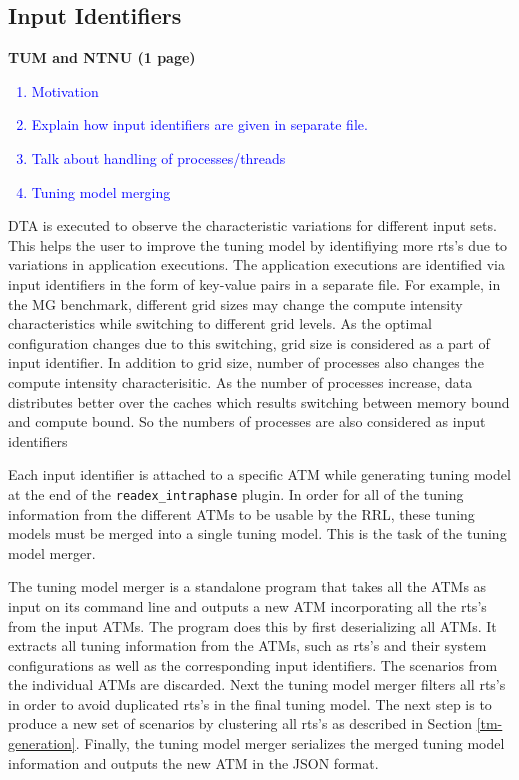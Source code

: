 \subsection{Input Identifiers} \label{sec:input}
\textbf{TUM and NTNU (1 page)}
\textcolor{blue}{
\begin{enumerate}
	\item Motivation
	\item Explain how input identifiers are given in separate file.
	\item Talk about handling of processes/threads
	\item Tuning model merging
\end{enumerate}}
DTA is executed to observe the characteristic variations for different input sets. This helps the user to improve the tuning model by identifiying more rts's due to variations in application executions. The application executions are identified via input identifiers in the form of key-value pairs in a separate file. For example, in the MG benchmark, different grid sizes may change the compute intensity characteristics while switching to different grid levels. As the optimal configuration changes due to this switching, grid size is considered as a part of input identifier. In addition to grid size, number of processes also changes the compute intensity characterisitic. As the number of processes increase, data distributes better over the caches which results switching between memory bound and compute bound. So the numbers of processes are also considered as input identifiers

Each input identifier is attached to a specific ATM while generating tuning model at the end of the \texttt{readex\_intraphase} plugin. In order for all of the tuning information from the different ATMs to be usable by the RRL, these tuning models must be merged into a single tuning model. This is the task of the tuning model merger.

The tuning model merger is a standalone program that takes all the ATMs as input on its command line and outputs a new ATM incorporating all the rts's from the input ATMs. The program does this by first deserializing all ATMs. It extracts all tuning information from the ATMs, such as rts's and their system configurations as well as the corresponding input identifiers. The scenarios from the individual ATMs are discarded. Next the tuning model merger filters all rts's in order to avoid duplicated rts's in the final tuning model. The next step is to produce a new set of scenarios by clustering all rts's as described in Section \ref{tm-generation}. Finally, the tuning model merger serializes the merged tuning model information and outputs the new ATM in the JSON format.
